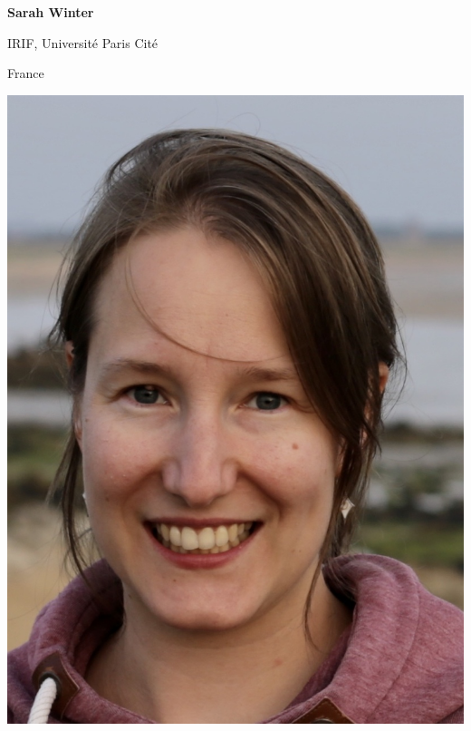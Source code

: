 \documentclass[a3paper, 12pt]{article}
\begin{document}
\begin{minipage}[t]{.43\linewidth}
  \begin{minipage}{.75\linewidth}
    \flushright%
    \textbf{Sarah Winter}

    IRIF, Université Paris Cité

    France
  \end{minipage}
  \hfill
  \begin{minipage}{.2\linewidth}
    \includegraphics[width=\linewidth, trim=0 0 0 0, clip]{winter}
  \end{minipage}

  \medskip

  


\end{minipage}
\end{document}
